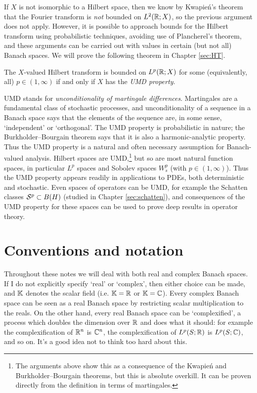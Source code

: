 If $X$ is not isomorphic to a Hilbert space, then we know by Kwapie\'n's theorem that the Fourier transform is \emph{not} bounded on $L^2(\mathbb{R};X)$, so the previous argument does not apply.
However, it is possible to approach bounds for the Hilbert transform using probabilistic techniques, avoiding use of Plancherel's theorem, and these arguments can be carried out with values in certain (but not all) Banach spaces.
We will prove the following theorem in Chapter \ref{sec:HT}.

\begin{thm}
  The $X$-valued Hilbert transform is bounded on $L^p(\mathbb{R};X)$ for some (equivalently, all) $p \in (1,\infty)$ if and only if $X$ has the \emph{UMD property}.
\end{thm}

UMD stands for \emph{unconditionality of martingale differences}.
Martingales are a fundamental class of stochastic processes, and unconditionality of a sequence in a Banach space says that the elements of the sequence are, in some sense, `independent' or `orthogonal'.
The UMD property is probabilistic in nature; the Burkholder--Bourgain theorem says that it is also a harmonic-analytic property.
Thus the UMD property is a natural and often necessary assumption for Banach-valued analysis.
Hilbert spaces are UMD,\footnote{The arguments above show this as a consequence of the Kwapie\'n and Burkholder--Bourgain theorems, but this is absolute overkill. It can be proven directly from the definition in terms of martingales.} but so are most natural function spaces, in particular $L^p$ spaces and Sobolev spaces $W^{p}_{s}$ (with $p \in (1,\infty)$).
Thus the UMD property appears readily in applications to PDEs, both deterministic and stochastic.
Even spaces of operators can be UMD, for example the Schatten classes $\mathcal{S}^{p} \subset B(H)$ (studied in Chapter \ref{sec:schatten}), and consequences of the UMD property for these spaces can be used to prove deep results in operator theory.


\section{Conventions and notation}\label{sec:conventions}
Throughout these notes we will deal with both real and complex Banach spaces.
If I do not explicitly specify `real' or `complex', then either choice can be made, and $\mathbb{K}$ denotes the scalar field (i.e. $\mathbb{K} = \mathbb{R}$ or $\mathbb{K} = \mathbb{C}$).
Every complex Banach space can be seen as a real Banach space by restricting scalar multiplication to the reals.
On the other hand, every real Banach space can be `complexified', a process which doubles the dimension over $\mathbb{R}$ and does what it should: for example the complexification of $\mathbb{R}^n$ is $\mathbb{C}^n$, the complexification of $L^p(S;\mathbb{R})$ is $L^p(S;\mathbb{C})$, and so on.
It's a good idea not to think too hard about this.

